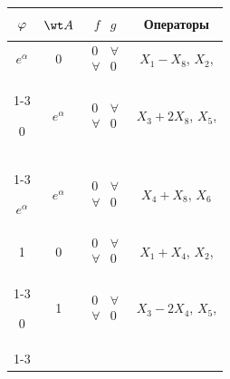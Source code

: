 \begin{center} 


\begin{tabular}{|c|c|c|c|} 


\hline 


$\myrule\varphi$& $\wt A$& $\begin{matrix}f & g\end{matrix}$ & Операторы \\ 


\hline 


%


$e^\alpha$ & 0 & $\begin{matrix} 0 & \forall \\ \forall & 0\end{matrix}$


& $X_1-X_8$, $X_2$,\\


\cline{1-3}


0 & $e^\alpha$ & $\begin{matrix} 0 & \forall \\ \forall & 0\end{matrix}$


& $X_3+2X_8$, $X_5$, \\


\cline{1-3}


$e^\alpha$ & $e^\alpha$ &


$\begin{matrix} 0 & \forall \\ \forall & 0\end{matrix}$ &


$X_4+X_8$, $X_6$ \\


\hline


%


1 & 0 & $\begin{matrix} 0 & \forall \\ \forall & 0\end{matrix}$


& $X_1+X_4$, $X_2$, \\ 


\cline{1-3}


0 & 1 & $\begin{matrix} 0 & \forall \\ \forall & 0\end{matrix}$


& $X_3-2X_4$, $X_5$, \\ 


\cline{1-3}



\end{tabular}
\end{center}
